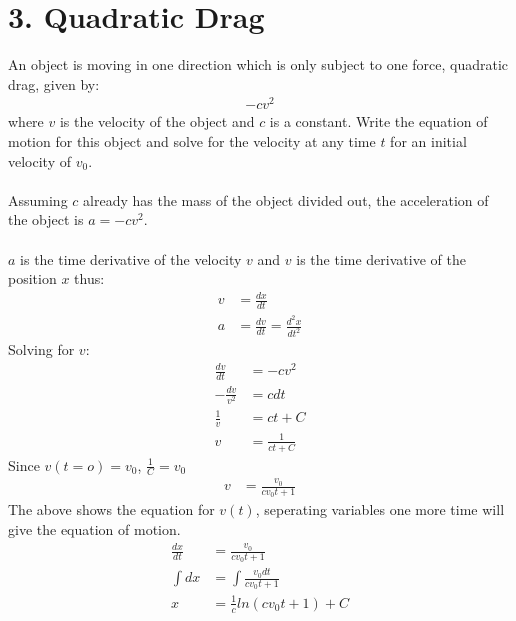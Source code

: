\documentclass[a4paper,12pt]{article}
\newcommand{\F}[2]{\ensuremath{\frac{#1}{#2}}}
\begin{document}
\section*{3. Quadratic Drag}
An object is moving in one direction which is only subject to one force, quadratic drag, given by:
\begin{align*}
-cv^2
\end{align*}
where $v$ is the velocity of the object and $c$ is a constant. Write the equation of motion for this object and solve for the velocity at any time $t$ for an initial velocity of $v_0$.\\
\\
Assuming $c$ already has the mass of the object divided out, the acceleration of the object is $a=-cv^2$.\\
\\
$a$ is the time derivative of the velocity $v$ and $v$ is the time derivative of the position $x$ thus:
\begin{align*}
v&=\F{dx}{dt}\\
a&=\F{dv}{dt}=\F{d^2x}{dt^2}
\end{align*}
Solving for $v$:
\begin{align*}
\F{dv}{dt}&=-cv^2\\
-\F{dv}{v^2}&=cdt\\
\F{1}{v}&=ct+C\\
v&=\F{1}{ct+C}
\end{align*}
Since $v(t=o)=v_0$, $\F{1}{C}=v_0$
\begin{align*}
v&= \F{v_0}{cv_0t+1}
\end{align*}
The above shows the equation for $v(t)$, seperating variables one more time will give the equation of motion.
\begin{align*}
\F{dx}{dt}&=\F{v_0}{cv_0t+1}\\
\int dx&=\int\F{v_0dt}{cv_0t+1}\\
x&=\F{1}{c}ln(cv_0t+1)+C
\end{align*}
\end{document}
